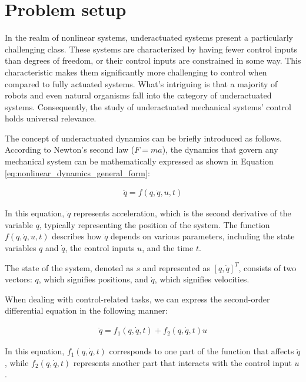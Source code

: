 \section{Problem setup}
In the realm of nonlinear systems, underactuated systems\cite{liu2013survey} present a particularly challenging class. These systems are characterized by having fewer control inputs than degrees of freedom, or their control inputs are constrained in some way. This characteristic makes them significantly more challenging to control when compared to fully actuated systems. What's intriguing is that a majority of robots and even natural organisms fall into the category of underactuated systems. Consequently, the study of underactuated mechanical systems' control holds universal relevance.

The concept of underactuated dynamics can be briefly introduced as follows. According to Newton's second law (\( F = ma \)), the dynamics that govern any mechanical system can be mathematically expressed as shown in Equation \ref{eq:nonlinear_dynamics_general_form}:

\begin{align}
    \ddot{q} = f(q, \dot{q}, u, t)
    \label{eq:nonlinear_dynamics_general_form}
\end{align}

In this equation, \( \ddot{q} \) represents acceleration, which is the second derivative of the variable \( q \), typically representing the position of the system. The function \( f(q, \dot{q}, u, t) \) describes how \( \ddot{q} \) depends on various parameters, including the state variables \( q \) and \( \dot{q} \), the control inputs \( u \), and the time \( t \).

The state of the system, denoted as \( s \) and represented as \( [q, \dot{q}]^T \), consists of two vectors: \( q \), which signifies positions, and \( \dot{q} \), which signifies velocities.

When dealing with control-related tasks, we can express the second-order differential equation in the following manner:

\begin{align}
    \ddot{q} = f_1(q, \dot{q}, t) + f_2(q, \dot{q}, t)u
    \label{eq:nonlinear_dynamics_control_form}
\end{align}

In this equation, \( f_1(q, \dot{q}, t) \) corresponds to one part of the function that affects \( \ddot{q} \), while \( f_2(q, \dot{q}, t) \) represents another part that interacts with the control input \( u \).

